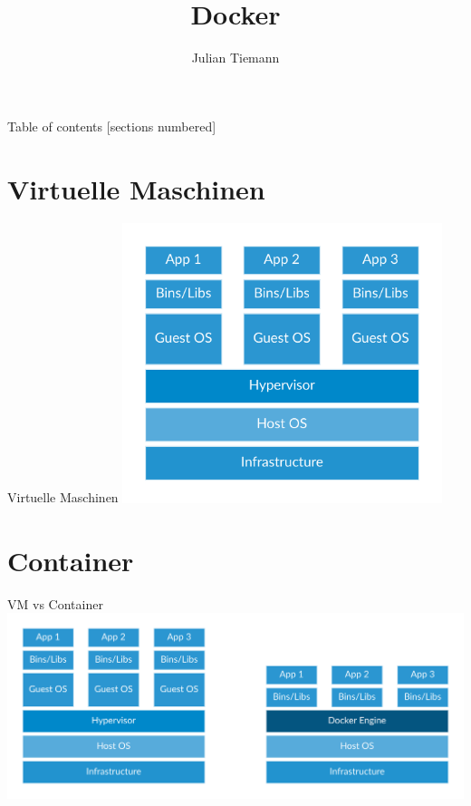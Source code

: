 \documentclass[10pt]{beamer}
\title{Docker}
\date{}
\author{Julian Tiemann}
\institute{Universit\"at Hamburg}
\begin{document}
\maketitle

\begin{frame}{Table of contents}
  [sections numbered]
  \tableofcontents[hideallsubsections]
\end{frame}


%
%

\section{Virtuelle Maschinen}

\begin{frame}{Virtuelle Maschinen}
  \center
  \includegraphics[width=0.7\textwidth]{../images/1-docker-vm.png}
\end{frame}

\section{Container}

\begin{frame}{VM vs Container}
  \includegraphics[width=1\textwidth]{../images/6-container-vm.png}
\end{frame}
\end{document}
